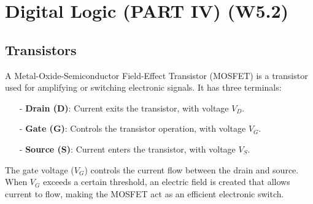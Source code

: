 \documentclass[12pt,openany]{book}
\begin{document}
			      	\chapter{Digital Logic (PART IV) (W5.2)}
			      	
				
			      	\section{Transistors}
			      	A Metal-Oxide-Semiconductor Field-Effect Transistor (MOSFET) is a transistor used for amplifying or switching electronic signals. It has three terminals:
			      	
			      	\begin{itemize}
			      		\item[-] \textbf{Drain (D)}: Current exits the transistor, with voltage \( V_D\).
			      		\item[-] \textbf{Gate (G)}: Controls the transistor operation, with voltage \( V_G\).
			      		\item[-] \textbf{Source (S)}: Current enters the transistor, with voltage \( V_S\).
			      	\end{itemize}
			      	
			      	
			      	
			      	The gate voltage (\( V_G \)) controls the current flow between the drain and source. When \( V_G \) exceeds a certain threshold, an electric field is created that allows current to flow, making the MOSFET act as an efficient electronic switch.
			     \newpage
\end{document}
